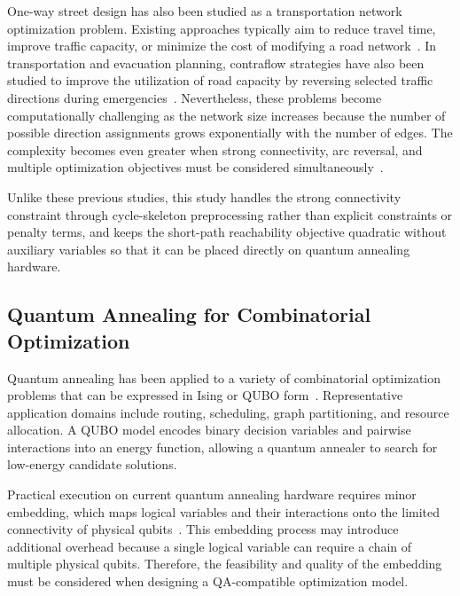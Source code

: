 \documentclass[twocolumn,a4paper]{article}
\begin{document}
One-way street design has also been studied as a transportation network optimization problem. Existing approaches typically aim to reduce travel time, improve traffic capacity, or minimize the cost of modifying a road network~\cite{drezner1997selecting, huang2020bi, huang2020model}. In transportation and evacuation planning, contraflow strategies have also been studied to improve the utilization of road capacity by reversing selected traffic directions during emergencies~\cite{kim2008contraflow, aksu2014mathematical}. Nevertheless, these problems become computationally challenging as the network size increases because the number of possible direction assignments grows exponentially with the number of edges. The complexity becomes even greater when strong connectivity, arc reversal, and multiple optimization objectives must be considered simultaneously~\cite{burkard1999minimum, bangjensen2023complexity}.

Unlike these previous studies, this study handles the strong connectivity constraint through cycle-skeleton preprocessing rather than explicit constraints or penalty terms, and keeps the short-path reachability objective quadratic without auxiliary variables so that it can be placed directly on quantum annealing hardware.

\subsection{Quantum Annealing for Combinatorial Optimization} \label{subsec:related_qa}

Quantum annealing has been applied to a variety of combinatorial optimization problems that can be expressed in Ising or QUBO form~\cite{qa_for_optimize}. Representative application domains include routing, scheduling, graph partitioning, and resource allocation. A QUBO model encodes binary decision variables and pairwise interactions into an energy function, allowing a quantum annealer to search for low-energy candidate solutions.

Practical execution on current quantum annealing hardware requires minor embedding, which maps logical variables and their interactions onto the limited connectivity of physical qubits~\cite{minor_embedding_inQA2, minor_embedding_inQA}. This embedding process may introduce additional overhead because a single logical variable can require a chain of multiple physical qubits. Therefore, the feasibility and quality of the embedding must be considered when designing a QA-compatible optimization model.
\end{document}
